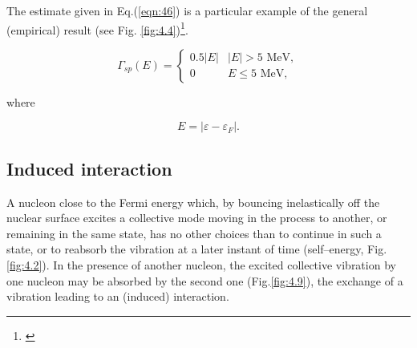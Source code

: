 The estimate given in Eq.(\ref{eqn:46}) is a particular example of the general (empirical) result (see Fig. \ref{fig:4.4})\footnote{\cite{Bertsch:83}}.

\begin{equation}
\Gamma_{sp} (E) =
  \begin{cases}
    0.5 |E| & \text{$|E|>5$ MeV}, \\
    0     & \text{$E \leq 5$ MeV},
  \end{cases}
\label{eqn:47}
\end{equation}

\noindent where

\begin{equation}
E = |\varepsilon - \varepsilon_F| .
\label{eqn:48}
\end{equation}

\subsection{Induced interaction}\label{Sect2.3.2}

A nucleon close to the Fermi energy which, by bouncing inelastically off the nuclear surface excites a collective mode moving in the process to another, or remaining in the same state, has no other choices than to continue in such a state, or to reabsorb the vibration at a later instant of time (self--energy, Fig. \ref{fig:4.2}). In the presence of another nucleon, the excited  collective vibration  by one nucleon may be absorbed by the second one (Fig.\ref{fig:4.9}), the exchange of a vibration leading to an (induced) interaction.

